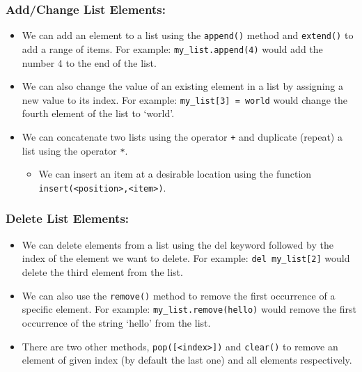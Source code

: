 \documentclass[11pt]{article}
\providecommand{\tightlist}{%
      \setlength{\itemsep}{0pt}\setlength{\parskip}{0pt}}
\begin{document}
\hypertarget{addchange-list-elements}{%
\subsubsection{Add/Change List
Elements:}\label{addchange-list-elements}}

\begin{itemize}
\tightlist
\item
  We can add an element to a list using the \texttt{append()} method and
  \texttt{extend()} to add a range of items. For example:
  \texttt{my\_list.append(4)} would add the number 4 to the end of the
  list.
\item
  We can also change the value of an existing element in a list by
  assigning a new value to its index. For example:
  \texttt{my\_list{[}3{]}\ =\ \textquotesingle{}world\textquotesingle{}}
  would change the fourth element of the list to `world'.
\item
  We can concatenate two lists using the operator \texttt{+} and
  duplicate (repeat) a list using the operator \texttt{*}.

  \begin{itemize}
  \tightlist
  \item
    We can insert an item at a desirable location using the function
    \texttt{insert(\textless{}position\textgreater{},\textless{}item\textgreater{})}.
  \end{itemize}
\end{itemize}

\hypertarget{delete-list-elements}{%
\subsubsection{Delete List Elements:}\label{delete-list-elements}}

\begin{itemize}
\item
  We can delete elements from a list using the del keyword followed by
  the index of the element we want to delete. For example:
  \texttt{del\ my\_list{[}2{]}} would delete the third element from the
  list.
\item
  We can also use the \texttt{remove()} method to remove the first
  occurrence of a specific element. For example:
  \texttt{my\_list.remove(\textquotesingle{}hello\textquotesingle{})}
  would remove the first occurrence of the string `hello' from the list.
\item
  There are two other methods,
  \texttt{pop({[}\textless{}index\textgreater{}{]})} and
  \texttt{clear()} to remove an element of given index (by default the
  last one) and all elements respectively.
\end{itemize}
\end{document}
